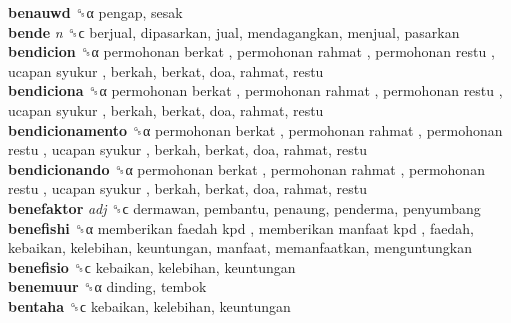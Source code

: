 \textbf{benauwd} ␝α  pengap, sesak  \\
\textbf{bende} \emph{n}  ␝ϲ  berjual, dipasarkan, jual, mendagangkan, menjual, pasarkan  \\
\textbf{bendicion} ␝α   permohonan berkat ,  permohonan rahmat ,  permohonan restu ,  ucapan syukur , berkah, berkat, doa, rahmat, restu  \\
\textbf{bendiciona} ␝α   permohonan berkat ,  permohonan rahmat ,  permohonan restu ,  ucapan syukur , berkah, berkat, doa, rahmat, restu  \\
\textbf{bendicionamento} ␝α   permohonan berkat ,  permohonan rahmat ,  permohonan restu ,  ucapan syukur , berkah, berkat, doa, rahmat, restu  \\
\textbf{bendicionando} ␝α   permohonan berkat ,  permohonan rahmat ,  permohonan restu ,  ucapan syukur , berkah, berkat, doa, rahmat, restu  \\
\textbf{benefaktor} \emph{adj}  ␝ϲ  dermawan, pembantu, penaung, penderma, penyumbang  \\
\textbf{benefishi} ␝α   memberikan faedah kpd ,  memberikan manfaat kpd , faedah, kebaikan, kelebihan, keuntungan, manfaat, memanfaatkan, menguntungkan  \\
\textbf{benefisio} ␝ϲ  kebaikan, kelebihan, keuntungan  \\
\textbf{benemuur} ␝α  dinding, tembok  \\
\textbf{bentaha} ␝ϲ  kebaikan, kelebihan, keuntungan  \\
